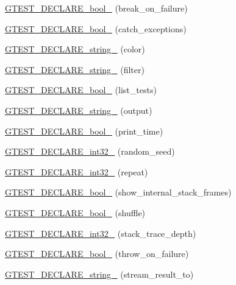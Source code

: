 \begin{DoxyCompactItemize}
\item 
\hyperlink{namespacetesting_a5868c3980b2f69f511fc8c3de7cdfc17}{G\+T\+E\+S\+T\+\_\+\+D\+E\+C\+L\+A\+R\+E\+\_\+bool\+\_\+} (break\+\_\+on\+\_\+failure)
\item 
\hyperlink{namespacetesting_ab6f1777f7b740f31e41f7da017447b58}{G\+T\+E\+S\+T\+\_\+\+D\+E\+C\+L\+A\+R\+E\+\_\+bool\+\_\+} (catch\+\_\+exceptions)
\item 
\hyperlink{namespacetesting_a0f658c915a1e60996a2ab00a06612723}{G\+T\+E\+S\+T\+\_\+\+D\+E\+C\+L\+A\+R\+E\+\_\+string\+\_\+} (color)
\item 
\hyperlink{namespacetesting_a20d69860ce843142c7f740262e6b0c9a}{G\+T\+E\+S\+T\+\_\+\+D\+E\+C\+L\+A\+R\+E\+\_\+string\+\_\+} (filter)
\item 
\hyperlink{namespacetesting_af2cd3595c571ca408afc337bc4bb2619}{G\+T\+E\+S\+T\+\_\+\+D\+E\+C\+L\+A\+R\+E\+\_\+bool\+\_\+} (list\+\_\+tests)
\item 
\hyperlink{namespacetesting_a3fe54dd551f1c36cfdd1b36cd6881a44}{G\+T\+E\+S\+T\+\_\+\+D\+E\+C\+L\+A\+R\+E\+\_\+string\+\_\+} (output)
\item 
\hyperlink{namespacetesting_aeccefd463a0942da24750e1bbee76041}{G\+T\+E\+S\+T\+\_\+\+D\+E\+C\+L\+A\+R\+E\+\_\+bool\+\_\+} (print\+\_\+time)
\item 
\hyperlink{namespacetesting_ae754999b59509808254d39e3a3cf38e0}{G\+T\+E\+S\+T\+\_\+\+D\+E\+C\+L\+A\+R\+E\+\_\+int32\+\_\+} (random\+\_\+seed)
\item 
\hyperlink{namespacetesting_a315ef0647e4f2795bf1705de8e9c9659}{G\+T\+E\+S\+T\+\_\+\+D\+E\+C\+L\+A\+R\+E\+\_\+int32\+\_\+} (repeat)
\item 
\hyperlink{namespacetesting_af37b9206b938bb8b7d398a1379eb7482}{G\+T\+E\+S\+T\+\_\+\+D\+E\+C\+L\+A\+R\+E\+\_\+bool\+\_\+} (show\+\_\+internal\+\_\+stack\+\_\+frames)
\item 
\hyperlink{namespacetesting_a6d87f7374e105483905a305328856f4b}{G\+T\+E\+S\+T\+\_\+\+D\+E\+C\+L\+A\+R\+E\+\_\+bool\+\_\+} (shuffle)
\item 
\hyperlink{namespacetesting_adba6f8afa0f8695956d0134f1629a10b}{G\+T\+E\+S\+T\+\_\+\+D\+E\+C\+L\+A\+R\+E\+\_\+int32\+\_\+} (stack\+\_\+trace\+\_\+depth)
\item 
\hyperlink{namespacetesting_ac69f2aeeb84dc5f49bd3d040a6f32d17}{G\+T\+E\+S\+T\+\_\+\+D\+E\+C\+L\+A\+R\+E\+\_\+bool\+\_\+} (throw\+\_\+on\+\_\+failure)
\item 
\hyperlink{namespacetesting_ad4d1ea63037fc21018dbe997cb0041d1}{G\+T\+E\+S\+T\+\_\+\+D\+E\+C\+L\+A\+R\+E\+\_\+string\+\_\+} (stream\+\_\+result\+\_\+to)

\end{DoxyCompactItemize}
